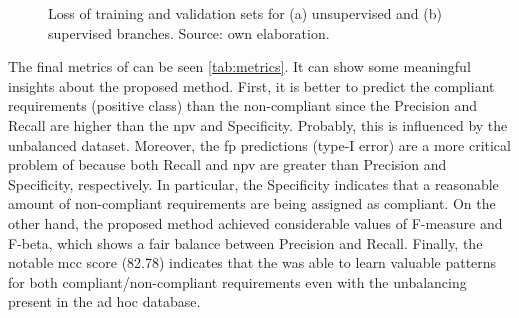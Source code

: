 \begin{figure}[ht]
\centering
{}
\hfill
\ContinuedFloat
{}
\caption{Loss of training and validation sets for (a) unsupervised and (b) supervised branches. Source: own elaboration.}
\label{fig:losses}
\end{figure}

The final metrics of \methodname can be seen \autoref{tab:metrics}. It can show some meaningful insights about the proposed method. First, it is better to predict the compliant requirements (positive class) than the non-compliant since the Precision and Recall are higher than the \acs{npv} and Specificity. Probably, this is influenced by the unbalanced dataset. Moreover, the \acl{fp} predictions (type-I error) are a more critical problem of \methodname because both Recall and \acs{npv} are greater than Precision and Specificity, respectively. In particular, the Specificity indicates that a reasonable amount of non-compliant requirements are being assigned as compliant. On the other hand, the proposed method achieved considerable values of F-measure and F-beta, which shows a fair balance between Precision and Recall. Finally, the notable \acs{mcc} score (82.78) indicates that the \methodname was able to learn valuable patterns for both compliant/non-compliant requirements even with the unbalancing present in the ad hoc database.

